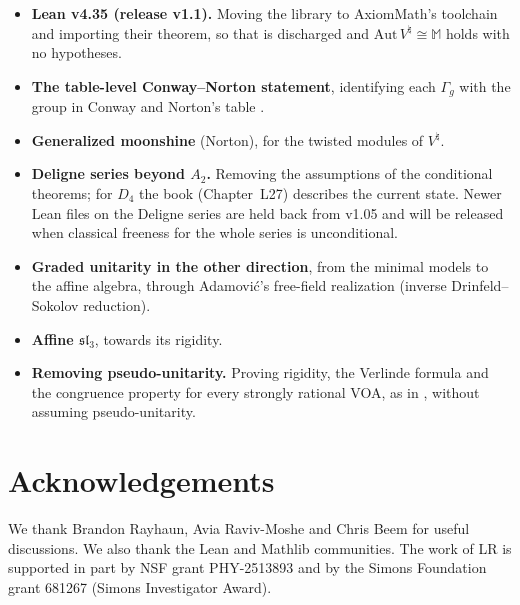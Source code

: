 \documentclass[10pt]{article}
\newcommand{\slthree}{\mathfrak{sl}_3}
\newcommand{\Mon}{\mathbb{M}}
\begin{document}
\begin{itemize}
  \item \textbf{Lean v4.35 (release v1.1).} Moving the library to AxiomMath's toolchain and importing their theorem, so
    that  is discharged and $\mathrm{Aut}\,V^\natural\cong\Mon$ holds with no hypotheses.
  \item \textbf{The table-level Conway--Norton statement}, identifying each $\Gamma_g$ with the group in Conway and
    Norton's table \cite{ConwayNorton}.
  \item \textbf{Generalized moonshine} (Norton), for the twisted modules of $V^\natural$.
  \item \textbf{Deligne series beyond $A_2$.} Removing the assumptions of the conditional theorems; for $D_4$ the
    book (Chapter~L27) describes the current state. Newer Lean files on the Deligne series are held back from v1.05
    and will be released when classical freeness for the whole series is unconditional.
  \item \textbf{Graded unitarity in the other direction}, from the minimal models to the affine algebra, through
    Adamovi\'c's free-field realization (inverse Drinfeld--Sokolov reduction).
  \item \textbf{Affine $\slthree$}, towards its rigidity.
  \item \textbf{Removing pseudo-unitarity.} Proving rigidity, the Verlinde formula and the congruence property for
    every strongly rational VOA, as in \cite{HuangRigidity,HuangVerlinde,DongLinNg}, without assuming
    pseudo-unitarity.
\end{itemize}

\section*{Acknowledgements}
We thank Brandon Rayhaun, Avia Raviv-Moshe and Chris Beem for useful discussions. We also thank the Lean and
Mathlib communities. The work of LR is supported in part by NSF grant PHY-2513893 and by the Simons Foundation
grant 681267 (Simons Investigator Award).
\end{document}
